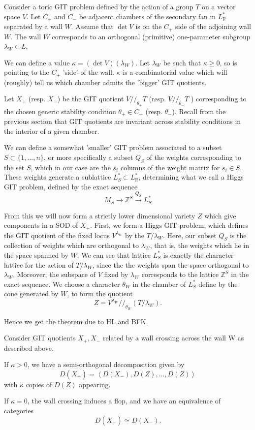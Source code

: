 Consider a toric GIT problem defined by the action of a group $T$ on a vector space $V$. Let $C_+$ and $C_-$ be adjacent chambers of the secondary fan in $L^{*}_\mathbb{R}$ separated by a wall $W$. Assume that $\det V$ is on the $C_{+}$ side of the adjoining wall $W$. The wall $W$ corresponds to an orthogonal (primitive) one-parameter subgroup $\lambda_{W}\in L$.

We can define a value $\kappa = (\det V)(\lambda_W)$. Let $\lambda_W$ be such that $\kappa \geq 0$, so is pointing to the $C_+$ 'side' of the wall. $\kappa$ is a combinatorial value which will (roughly) tell us which chamber admits the 'bigger' GIT quotients. 

Let $X_+$ (resp. $X_-$) be the GIT quotient $V // _{\theta_{+}}T$ (resp. $V // _{\theta_{-}}T$ ) corresponding to the chosen generic stability condition $\theta_{+}\in C_+$ (resp. $\theta_-$).  Recall from the previous section that GIT quotients are invariant across stability conditions in the interior of a given chamber. 

We can define a somewhat 'smaller' GIT problem associated to a subset $S \subset \{ 1,\dots,n \}$, or more specifically a subset $Q_S$ of the weights corresponding to the set $S$, which in our case are the $s_i$ columns of the weight matrix for $s_{i}\in S$. These weights generate a sublattice $L_{S}^{*}\subset L_\mathbb{R}^*$, determining what we call a Higgs GIT problem, defined by the exact sequence $$M_{S}\to \mathbb{Z}^{S}\xrightarrow{Q_{S}}L_{S}^{*}$$

From this we will now form a strictly lower dimensional variety $Z$ which give components in a SOD of $X_+$. First, we form a Higgs GIT problem, which defines the GIT quotient of the fixed locus $V^{\lambda_{W}}$ by the $T/\lambda_W$. Here, our subset $Q_S$  is the collection of weights which are orthogonal to $\lambda_W$, that is, the weights which lie in the space spanned by $W$. We can see that lattice $L_S^*$ is exactly the character lattice for the action of $T/\lambda_W$, since the the weights span the space orthogonal to $\lambda_W$. Moreover, the subspace of $V$ fixed by $\lambda_W$ corresponds to the lattice $\mathbb{Z}^S$ in the exact sequence. We choose a character $\theta_W$ in the chamber of $L_{S}^*$ define by the cone generated by $W$, to form the quotient $$Z = V^{\lambda_{W}} / /_{\theta_{W}} \left( T/ \lambda_{W}\right) . $$

Hence we get the theorem due to HL and BFK.

\begin{theorem}{}{}
    Consider GIT quotients $X_{+},X_{-}$  related by a wall crossing across the wall W as described above. 

If $\kappa > 0$, we have a semi-orthogonal decomposition given by $$D(X_{+}) = \left< D(X_{-}),D(Z) , \dots, D(Z)  \right>$$with $\kappa$ copies of $D(Z)$ appearing.

If $\kappa = 0$, the wall crossing induces a flop, and we have an equivalence of categories $$D(X_{+})\simeq D(X_-).$$
\end{theorem}

